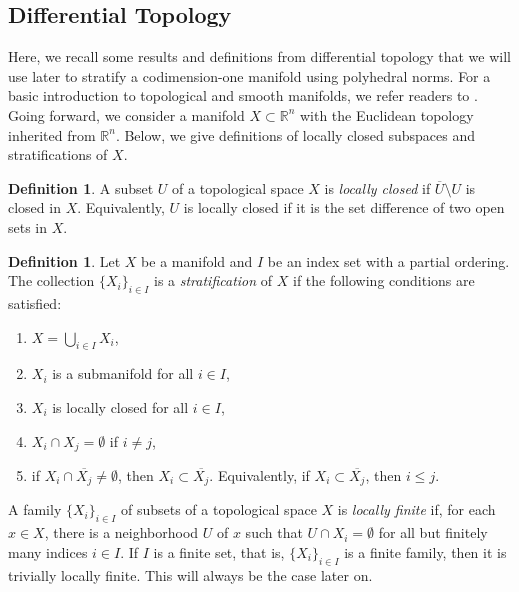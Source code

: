 \documentclass{article}
\numberwithin{theorem}{section}
\theoremstyle{definition}
\newtheorem{definition}[theorem]{Definition}
\theoremstyle{example_contd}
\newcommand{\RR}{\mathbb{R}}
\begin{document}
\subsection{Differential Topology} \label{sec:top}


Here, we recall some results and definitions from differential topology that we will use later to stratify a codimension-one manifold using polyhedral norms. For a basic introduction to topological and smooth manifolds, we refer readers to \cite{lee2,lee1}. 
Going forward, we consider a manifold $X \subset \RR^n$ with the Euclidean topology inherited from $\RR^n$.  Below, we give definitions of locally closed subspaces and stratifications of $X$.

\begin{definition}
	A subset $U$ of a topological space $X$ is \textit{locally closed} if $\overline{U}\setminus U$ is closed in $X$. Equivalently, $U$ is locally closed if it is the set difference of two open sets in $X$.
\end{definition}



\begin{definition}\label{def:Strat_top_space}
    Let $X$ be a manifold and $I$ be an index set with a partial ordering. The collection $\{X_i\}_{i\in I}$ is a \textit{stratification} of $X$ if the following conditions are satisfied:
    \begin{enumerate}[label=(\roman*)]
        \item \label{def212:it1} $X=\bigcup_{i\in I}X_i$,
        \item \label{def212:it2}  $X_i$ is a submanifold for all $i\in I$,
        \item \label{def212:it3}  $X_i$ is locally closed for all $i\in I$,
        \item \label{def212:it4}  $X_i\cap X_j =\emptyset $ if $i\neq j$,
        \item \label{def212:it5}  if $X_i\cap \overline{X_j}\neq\emptyset$, then $X_i\subset \overline{X_j}$.  Equivalently, if $X_i\subset \overline{X_j}$, then $i\leq j$.
    \end{enumerate}
\end{definition}

			A family $\{X_i\}_{i\in I}$ of subsets of a topological space $X$ is \textit{locally finite} if, for each $x\in X$, there is a neighborhood $U$ of $x$ such that $U\cap X_i=\emptyset$ for all but finitely many indices $i\in I.$ If $I$ is a finite set, that is, $\{X_i\}_{i\in I}$ is a finite family, then it is trivially locally finite. This will always be the case later on.
\end{document}
